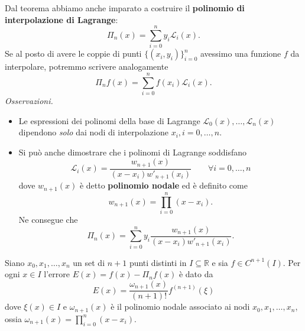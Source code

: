 Dal teorema abbiamo anche imparato a costruire il \textbf{polinomio di interpolazione di Lagrange}:
\begin{equation*}
\Pi _{n}(x) =\sum ^{n}_{i=0} y_{i}\mathcal{L}_{i}(x).
\end{equation*}
Se al posto di avere le coppie di punti $\{( x_{i} ,y_{i})\}^{n}_{i=0}$ avessimo una funzione $f$ da interpolare, potremmo scrivere analogamente
\begin{equation*}
\Pi _{n} f(x) =\sum ^{n}_{i=0} f( x_{i})\mathcal{L}_{i}(x).
\end{equation*}
\textit{Osservazioni.}
\begin{itemize}
\item Le espressioni dei polinomi della base di Lagrange $\mathcal{L}_{0}(x) ,\dotsc ,\mathcal{L}_{n}(x)$ dipendono \textit{solo} dai nodi di interpolazione $x_{i} ,i=0,\dotsc ,n$.
\item Si può anche dimostrare che i polinomi di Lagrange soddisfano
\begin{equation*}
\mathcal{L}_{i}(x) =\frac{w_{n+1}(x)}{( x-x_{i}) w'_{n+1}( x_{i})} \qquad \forall i=0,\dotsc ,n
\end{equation*}
dove $w_{n+1}(x)$ è detto \textbf{polinomio nodale} ed è definito come
\begin{equation*}
w_{n+1}(x) =\prod ^{n}_{i=0}( x-x_{i}).
\end{equation*}
Ne consegue che
\begin{equation*}
\Pi _{n}(x) =\sum\limits ^{n}_{i=0} y_{i}\frac{w_{n+1}(x)}{( x-x_{i}) w'_{n+1}( x_{i})}.
\end{equation*}
\end{itemize}
\begin{theorem}
Siano $x_{0} ,x_{1} ,\dotsc ,x_{n}$ un set di $n+1$ punti distinti in $I\subseteq \mathbb{R}$ e sia $f\in C^{n+1}(I)$. Per ogni $x\in I$ l'errore $E(x) =f(x) -\Pi _{n} f(x)$ è dato da
\begin{equation*}
E(x) =\frac{\omega _{n+1}(x)}{( n+1) !} f^{( n+1)}( \xi )
\end{equation*}
dove $\xi (x) \in I$ e $\omega _{n+1}(x)$ è il polinomio nodale associato ai nodi $x_{0} ,x_{1} ,\dotsc ,x_{n}$, ossia $\omega _{n+1}(x) =\prod ^{n}_{i=0}( x-x_{i})$.
\end{theorem}


